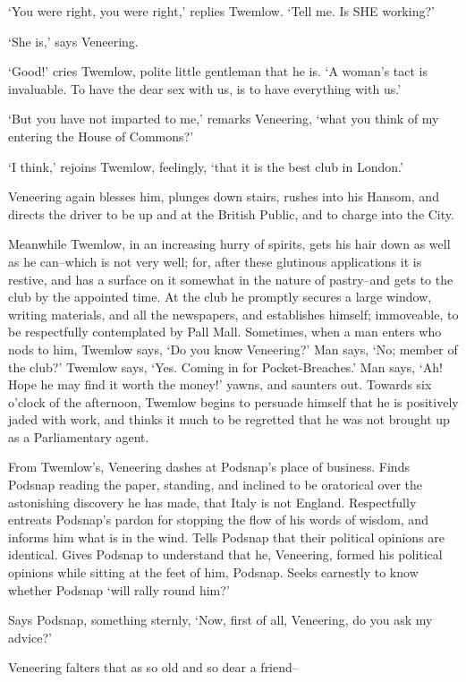 ‘You were right, you were right,’ replies Twemlow. ‘Tell me. Is SHE
working?’

‘She is,’ says Veneering.

‘Good!’ cries Twemlow, polite little gentleman that he is. ‘A woman’s
tact is invaluable. To have the dear sex with us, is to have everything
with us.’

‘But you have not imparted to me,’ remarks Veneering, ‘what you think of
my entering the House of Commons?’

‘I think,’ rejoins Twemlow, feelingly, ‘that it is the best club in
London.’

Veneering again blesses him, plunges down stairs, rushes into his
Hansom, and directs the driver to be up and at the British Public, and
to charge into the City.

Meanwhile Twemlow, in an increasing hurry of spirits, gets his hair down
as well as he can--which is not very well; for, after these glutinous
applications it is restive, and has a surface on it somewhat in the
nature of pastry--and gets to the club by the appointed time. At the
club he promptly secures a large window, writing materials, and all
the newspapers, and establishes himself; immoveable, to be respectfully
contemplated by Pall Mall. Sometimes, when a man enters who nods to
him, Twemlow says, ‘Do you know Veneering?’ Man says, ‘No; member of
the club?’ Twemlow says, ‘Yes. Coming in for Pocket-Breaches.’ Man says,
‘Ah! Hope he may find it worth the money!’ yawns, and saunters out.
Towards six o’clock of the afternoon, Twemlow begins to persuade
himself that he is positively jaded with work, and thinks it much to be
regretted that he was not brought up as a Parliamentary agent.

From Twemlow’s, Veneering dashes at Podsnap’s place of business. Finds
Podsnap reading the paper, standing, and inclined to be oratorical
over the astonishing discovery he has made, that Italy is not England.
Respectfully entreats Podsnap’s pardon for stopping the flow of his
words of wisdom, and informs him what is in the wind. Tells Podsnap that
their political opinions are identical. Gives Podsnap to understand that
he, Veneering, formed his political opinions while sitting at the feet
of him, Podsnap. Seeks earnestly to know whether Podsnap ‘will rally
round him?’

Says Podsnap, something sternly, ‘Now, first of all, Veneering, do you
ask my advice?’

Veneering falters that as so old and so dear a friend--

